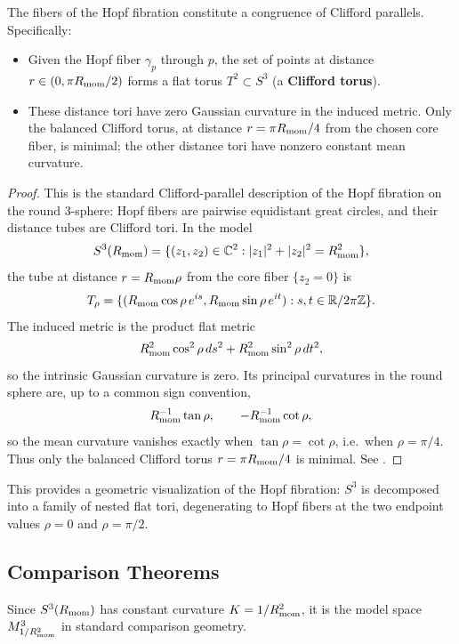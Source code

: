 \documentclass[11pt]{article}
\begin{document}
\begin{proposition}

\label{p1a:proposition:atlas-the-fibers-of-the-hopf-fibration-constitute-a-1e29697}
The fibers of the Hopf fibration constitute a congruence of Clifford parallels. Specifically:
\begin{itemize}
\item Given the Hopf fiber $\gamma_p$ through $p$, the set of points at distance $r \in (0, \pi R_{\mathrm{mom}}/2)$ forms a flat torus $T^2 \subset S^3$ (a \textbf{Clifford torus}).
\item These distance tori have zero Gaussian curvature in the induced metric.  Only the balanced Clifford torus, at distance $r=\pi R_{\mathrm{mom}}/4$ from the chosen core fiber, is minimal; the other distance tori have nonzero constant mean curvature.
\end{itemize}
\cite{hopf1931abbildung,besse1978manifolds,lawson1970minimal}
\end{proposition}

\begin{proof}
This is the standard Clifford-parallel description of the Hopf fibration on the round \(3\)-sphere: Hopf fibers are pairwise equidistant great circles, and their distance tubes are Clifford tori.  In the model
\[
S^3(R_{\mathrm{mom}})=\{(z_1,z_2)\in\mathbb{C}^2: |z_1|^2+|z_2|^2=R_{\mathrm{mom}}^2\},
\]
the tube at distance $r=R_{\mathrm{mom}}\rho$ from the core fiber $\{z_2=0\}$ is
\[
T_\rho=\{(R_{\mathrm{mom}}\cos\rho\,e^{is},R_{\mathrm{mom}}\sin\rho\,e^{it}):s,t\in\mathbb{R}/2\pi\mathbb{Z}\}.
\]
The induced metric is the product flat metric
\[
R_{\mathrm{mom}}^2\cos^2\rho\,ds^2+R_{\mathrm{mom}}^2\sin^2\rho\,dt^2,
\]
so the intrinsic Gaussian curvature is zero.  Its principal curvatures in the round sphere are, up to a common sign convention,
\[
R_{\mathrm{mom}}^{-1}\tan\rho,
\qquad
-R_{\mathrm{mom}}^{-1}\cot\rho,
\]
so the mean curvature vanishes exactly when $\tan\rho=\cot\rho$, i.e.\ when $\rho=\pi/4$.  Thus only the balanced Clifford torus $r=\pi R_{\mathrm{mom}}/4$ is minimal.  See \cite{do1992riemannian,Gluck2022,lawson1970minimal}.
\end{proof}


This provides a geometric visualization of the Hopf fibration: \(S^3\) is decomposed into a family of nested flat tori, degenerating to Hopf fibers at the two endpoint values \(\rho=0\) and \(\rho=\pi/2\).

\subsection{Comparison Theorems}

Since \(S^3(R_{\mathrm{mom}})\) has constant curvature \(K=1/R_{\mathrm{mom}}^2\), it is
the model space \(M^3_{1/R_{\mathrm{mom}}^2}\) in standard comparison geometry.
\end{document}
